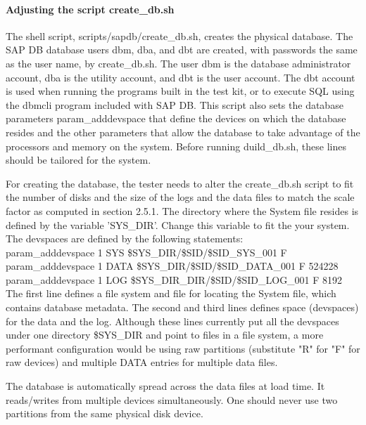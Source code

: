 \documentclass{article}
\begin{document}
\paragraph{Adjusting the script create\_db.sh}

\noindent
The shell script, scripts/sapdb/create\_db.sh, creates the physical
database. The SAP DB database users dbm, dba, and dbt are created,
with passwords the same as the user name, by create\_db.sh.  The user
dbm is the database administrator account, dba is the utility
account, and dbt is the user account.  The dbt account is used when
running the programs built in the test kit, or to execute SQL using
the dbmcli program included with SAP DB. This script also sets the
database parameters param\_adddevspace that define the devices on
which the database resides and the other parameters that allow the
database to take advantage of the processors and memory on the
system.  Before running duild\_db.sh, these lines should be tailored
for the system.

\noindent
For creating the database, the tester needs to alter the
create\_db.sh script to fit the number of disks and the size of the
logs and the data files to match the scale factor as computed in
section 2.5.1.  The directory where the System file resides is defined
by the variable 'SYS\_DIR'.  Change this variable to fit the your
system.  The devspaces are defined by the following statements: \\
\indent param\_adddevspace 1 SYS \$SYS\_DIR/\$SID/\$SID\_SYS\_001 F \\
\indent param\_adddevspace 1 DATA \$SYS\_DIR/\$SID/\$SID\_DATA\_001 F 524228 \\
\indent param\_adddevspace 1 LOG \$SYS\_DIR\_DIR/\$SID/\$SID\_LOG\_001 F 8192 \\

\noindent
The first line defines a file system and file for locating the System
file, which contains database metadata.  The second and third lines
defines space (devspaces) for the data and  the log.  Although these
lines currently put all the devspaces under one directory \$SYS\_DIR
and point to files in a file system, a more performant configuration
would be using raw partitions (substitute "R"  for "F"  for raw
devices) and multiple DATA entries for multiple data files.  

\noindent
The database is automatically spread across the data files at load
time.  It reads/writes from multiple devices simultaneously.  One
should never use two partitions from the same physical disk device.
\end{document}
